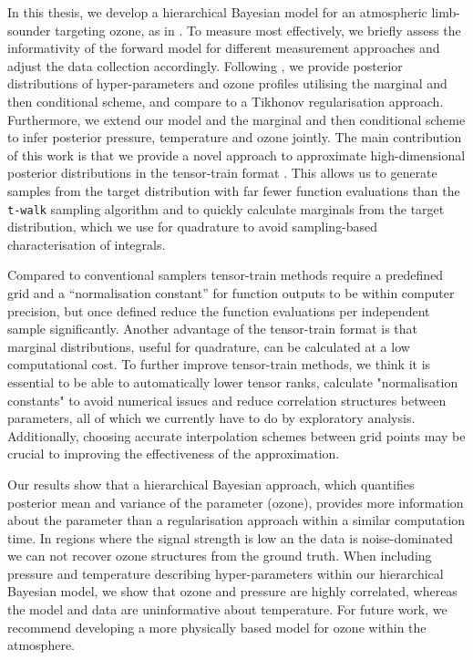 In this thesis, we develop a hierarchical Bayesian model for an atmospheric limb-sounder targeting ozone, as in \cite{mipas2000handbook}.
To measure most effectively, we briefly assess the informativity of the forward model for different measurement approaches and adjust the data collection accordingly.
Following \cite{fox2016fast}, we provide posterior distributions of hyper-parameters and ozone profiles utilising the marginal and then conditional scheme, and compare to a Tikhonov regularisation approach.
Furthermore, we extend our model and the marginal and then conditional scheme to infer posterior pressure, temperature and ozone jointly.
The main contribution of this work is that we provide a novel approach to approximate high-dimensional posterior distributions in the tensor-train format \cite{cui2022deep}.
This allows us to generate samples from the target distribution with far fewer function evaluations than the \texttt{t-walk} sampling algorithm \cite{christen2010general} and to quickly calculate marginals from the target distribution, which we use for quadrature to avoid sampling-based characterisation of integrals.

Compared to conventional samplers tensor-train methods require a predefined grid and a ``normalisation constant''  for function outputs to be within computer precision, but once defined reduce the function evaluations per independent sample significantly.
Another advantage of the tensor-train format is that marginal distributions, useful for quadrature, can be calculated at a low computational cost.
To further improve tensor-train methods, we think it is essential to be able to automatically lower tensor ranks, calculate "normalisation constants" to avoid numerical issues and reduce correlation structures between parameters, all of which we currently have to do by exploratory analysis.
Additionally, choosing accurate interpolation schemes between grid points may be crucial to improving the effectiveness of the approximation.

Our results show that a hierarchical Bayesian approach, which quantifies posterior mean and variance of the parameter (ozone), provides more information about the parameter than a regularisation approach within a similar computation time.
In regions where the signal strength is low an the data is noise-dominated we can not recover ozone structures from the ground truth.
When including pressure and temperature describing hyper-parameters within our hierarchical Bayesian model, we show that ozone and pressure are highly correlated, whereas the model and data are uninformative about temperature.
For future work, we recommend developing a more physically based model for ozone within the atmosphere.